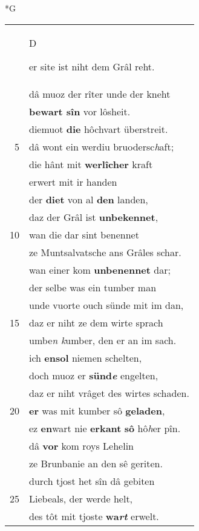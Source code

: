 \documentclass[8pt,a4paper,notitlepage]{article}
\begin{document}
\begin{table}[ht]
\begin{minipage}[t]{0.5\linewidth}
\small
\begin{center}*G
\end{center}
\begin{tabular}{rl}
 & \begin{large}D\end{large}er site ist niht dem Grâl reht.\\ 
 & dâ muoz der rîter unde der kneht\\ 
 & \textbf{bewart sîn} vor lôsheit.\\ 
 & diemuot \textbf{die} hôchvart überstreit.\\ 
5 & dâ wont ein werdiu bruodersc\textit{h}aft;\\ 
 & die hânt mit \textbf{werlîcher} kraft\\ 
 & erwert mit ir handen\\ 
 & der \textbf{diet} von al \textbf{den} landen,\\ 
 & daz der Grâl ist \textbf{unbekennet},\\ 
10 & wan die dar sint benennet\\ 
 & ze Muntsalvatsche ans Grâles schar.\\ 
 & wan einer kom \textbf{unbenennet} dar;\\ 
 & der selbe was ein tumber man\\ 
 & unde vuorte ouch sünde mit im dan,\\ 
15 & daz er niht ze dem wirte sprach\\ 
 & umbe\textit{n k}umber, den er an im sach.\\ 
 & ich \textbf{en}\textbf{sol} niemen schelten,\\ 
 & doch muoz er \textbf{sünd\textit{e}} engelten,\\ 
 & daz er niht vrâget des wirtes schaden.\\ 
20 & \textbf{er} was mit kumber sô \textbf{geladen},\\ 
 & ez \textbf{en}wart nie \textbf{erkant} \textbf{sô} hô\textit{h}er pîn.\\ 
 & dâ \textbf{vor} kom roys Lehelin\\ 
 & ze Brunbanie an den sê geriten.\\ 
 & durch tjost het sîn dâ gebiten\\ 
25 & Liebeals, der werde helt,\\ 
 & des tôt mit tjoste \textbf{wa\textit{rt}} erwelt.\\ 

\end{tabular}
\end{minipage}
\end{table}
\end{document}
